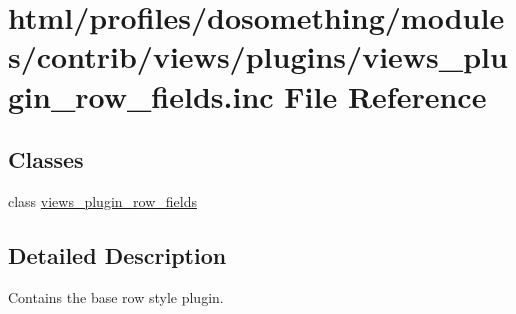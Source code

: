 \hypertarget{views__plugin__row__fields_8inc}{
\section{html/profiles/dosomething/modules/contrib/views/plugins/views\_\-plugin\_\-row\_\-fields.inc File Reference}
\label{views__plugin__row__fields_8inc}
}
\subsection*{Classes}
\begin{DoxyCompactItemize}
\item 
class \hyperlink{classviews__plugin__row__fields}{views\_\-plugin\_\-row\_\-fields}
\end{DoxyCompactItemize}


\subsection{Detailed Description}
Contains the base row style plugin. 